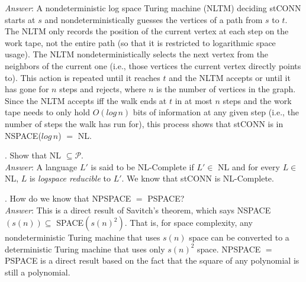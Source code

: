 \documentclass{scrartcl}
\begin{document}
    \noindent
    \textit{Answer}: A nondeterministic log space Turing machine (NLTM) deciding \textsf{stCONN}
    starts at $s$ and nondeterministically guesses the vertices of a path from $s$ to $t$. The NLTM
    only records the position of the current vertex at each step on the work tape, not the entire
    path (so that it is restricted to logarithmic space usage). The NLTM nondeterministically
    selects the next vertex from the neighbors of the current one (i.e., those vertices the current
    vertex directly points to). This action is repeated until it reaches $t$ and the NLTM accepts or
    until it has gone for $n$ steps and rejects, where $n$ is the number of vertices in the graph.
    Since the NLTM accepts iff the walk ends at $t$ in at most $n$ steps and the work tape needs to
    only hold $O(log\,n)$ bits of information at any given step (i.e., the number of steps the walk
    has run for), this process shows that \textsf{stCONN} is in \textsf{NSPACE($log\,n$) $=$ NL}.

    \newpage
    . Show that \textsf{NL} $\subseteq \mathcal{P}$.\\

    \noindent
    \textit{Answer}: A language $L'$ is said to be \textsf{NL}-Complete if $L' \in$ \textsf{NL} and
    for every $L \in$ \textsf{NL}, $L$ is \emph{logspace reducible} to $L'$. We know that
    \textsf{stCONN} is \textsf{NL}-Complete.

    \bigskip
    . How do we know that \textsf{NPSPACE $=$ PSPACE}?\\

    \noindent
    \textit{Answer}: This is a direct result of Savitch's theorem, which says \textsf{NSPACE$(s(n))
    \subseteq$ SPACE$(s(n)^2)$}. That is, for space complexity, any nondeterministic Turing machine
    that uses $s(n)$ space can be converted to a deterministic Turing machine that uses only
    $s(n)^2$ space. \textsf{NPSPACE $=$ PSPACE} is a direct result based on the fact that the square
    of any polynomial is still a polynomial.\\
\end{document}
